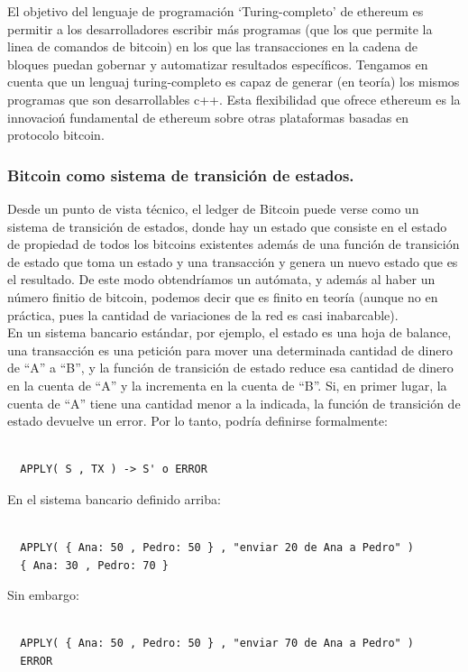 \documentclass[11pt,a4paper]{article}
\begin{document}
El objetivo del lenguaje de programación ‘Turing-completo’ de ethereum es permitir a los
desarrolladores escribir más programas (que los que permite la linea de comandos de bitcoin) en los que las transacciones en la cadena de bloques puedan gobernar y automatizar resultados específicos. Tengamos en cuenta que un lenguaj turing-completo es capaz de generar (en teoría) los mismos programas que son desarrollables c++. Esta flexibilidad que ofrece ethereum es  la innovacioń fundamental de ethereum sobre otras plataformas basadas en protocolo bitcoin.\\

\subsubsection{Bitcoin como sistema de transición de estados.}

Desde un punto de vista técnico, el ledger de Bitcoin puede verse como un sistema de
transición de estados, donde hay un estado que consiste en el estado de propiedad de todos los bitcoins existentes además de una función de transición de estado que toma un estado y una transacción y genera un nuevo estado que es el resultado. De este modo obtendríamos un autómata, y además al haber un número finitio de bitcoin, podemos decir que es finito en teoría (aunque no en práctica, pues la cantidad de variaciones de la red es casi inabarcable).\\

En un sistema bancario estándar, por ejemplo, el estado es una hoja de balance, una transacción es una petición para mover una determinada cantidad de dinero de “A” a “B”, y la función de transición de estado reduce esa cantidad de dinero en la cuenta de “A” y la incrementa en la cuenta de “B”. Si, en primer lugar, la cuenta de “A” tiene una cantidad menor a la indicada, la función de transición de estado devuelve un error. Por lo tanto, podría definirse formalmente:
\begin{lstlisting}

  APPLY( S , TX ) -> S' o ERROR

\end{lstlisting}


En el sistema bancario definido arriba:
\begin{lstlisting}

  APPLY( { Ana: 50 , Pedro: 50 } , "enviar 20 de Ana a Pedro" ) 
  { Ana: 30 , Pedro: 70 }

\end{lstlisting}
Sin embargo:
\begin{lstlisting}

  APPLY( { Ana: 50 , Pedro: 50 } , "enviar 70 de Ana a Pedro" ) 
  ERROR

\end{lstlisting}
\end{document}
